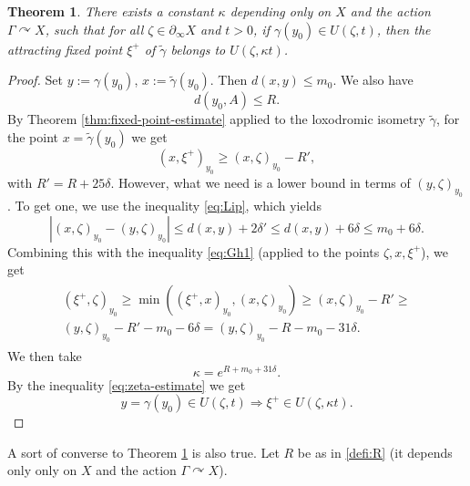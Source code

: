 \documentclass[12pt]{amsbook}%
\newtheorem{thm}{Theorem}[chapter]
\theoremstyle{definition}
\theoremstyle{remark}
\numberwithin{section}{chapter}
\numberwithin{subsection}{section}
\numberwithin{figure}{chapter}
\DeclareMathOperator{\acts}{\curvearrowright}
\def\Ga{\Gamma}
\def\ga{\gamma}
\def\geo{\partial_\infty}
\begin{document}
\begin{thm}\label{thm:redressing2}
There exists a constant $\kappa$ depending only on $X$ and the action $\Ga\acts X$, such that for all $\zeta\in \geo X$ and $t>0$, if  
$\ga (y_0)\in U(\zeta,t)$, then  the attracting fixed point $\xi^+$ of $\tilde{\gamma}$ belongs to $U(\zeta, \kappa t)$. 
\end{thm}
\begin{proof} Set $y:= \ga(y_0)$, $x:=\tilde\ga(y_0)$. Then $d(x, y)\leqslant m_0$. We also have 
$$
d(y_0, A)\leqslant R. 
$$
By Theorem \ref{thm:fixed-point-estimate} applied to the loxodromic isometry $\tilde\ga$, for the point $x=\tilde \ga(y_0)$ we get
$$
(x,\xi^+)_{y_0} \geqslant (x,\zeta)_{y_0} - R',
$$
with $R'=R+ 25\delta$. However, what we need is a lower bound in terms of $(y,\zeta)_{y_0}$. To get one, we use the inequality 
\eqref{eq:Lip}, which yields
\begin{equation}\label{eq:xyzeta_estimate}
|(x,\zeta)_{y_0}- (y,\zeta)_{y_0}|\leqslant d(x,y) + 2\delta'\leqslant d(x,y) + 6\delta\leqslant m_0 + 6\delta. 
\end{equation}
Combining this with the inequality \eqref{eq:Gh1} (applied to the points $\zeta, x, \xi^+$), we get 
\begin{align} 
\begin{aligned}\label{eq:zeta-estimate}
(\xi^+, \zeta)_{y_0}\geqslant \min \left( (\xi^+, x)_{y_0} , (x, \zeta)_{y_0}\right)\geqslant (x,\zeta)_{y_0} - R' \geqslant \\   (y,\zeta)_{y_0} - R' - m_0 - 6\delta=
(y,\zeta)_{y_0} - R -m_0 -31\delta. 
\end{aligned}
\end{align}
We then take 
$$
 \kappa= e^{R +m_0 +31\delta}.
$$
By the inequality \eqref{eq:zeta-estimate} we get 
$$
y=\ga(y_0)\in U(\zeta, t)\Rightarrow \xi^+\in U(\zeta, \kappa t). 
$$
\end{proof} 

A sort of converse to Theorem \ref{thm:redressing2} is also true. Let $R$ be as in \eqref{defi:R} 
(it depends only  only on $X$ and the action $\Ga\acts X$). 
\end{document}
